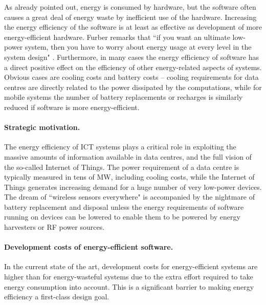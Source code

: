 \documentclass[oneside]{book}
\begin{document}
As already pointed out, energy is consumed by hardware, but the software often causes a great deal of energy waste by inefficient use of the hardware.  Increasing the energy efficiency of the software is at least as effective as development of more energy-efficient hardware.
Furber remarks 
that ``if you want an ultimate low-power system, then you have to worry about
energy usage at every level in the system design" \cite{Furber2016}.
Furthermore, in many cases the energy efficiency of software has a direct positive effect on the efficiency of other energy-related aspects of systems.  Obvious cases are cooling costs and battery costs -- cooling requirements for data centres are directly related to the power dissipated by the computations, while for mobile systems the number of battery replacements or recharges is similarly reduced if software is more energy-efficient.  

\paragraph{Strategic motivation.} 
The energy efficiency of ICT systems plays a critical role in exploiting the massive amounts of information available in data centres, and the full vision of the so-called Internet of Things.  The power requirement of a data centre is typically measured in tens of MW, including cooling costs, while the Internet of Things generates increasing demand for a huge number of very low-power devices. The dream of ``wireless sensors everywhere" is accompanied by the nightmare of battery replacement and disposal unless the energy requirements of software running on devices can be lowered to enable them to be powered by energy harvesters or RF power sources. 

\paragraph{Development costs of energy-efficient software.} In the current state of the art, development costs for energy-efficient systems are higher than for energy-wasteful systems due to the extra effort required to take energy consumption into account. This is a significant barrier to making energy efficiency a first-class design goal.
\end{document}
